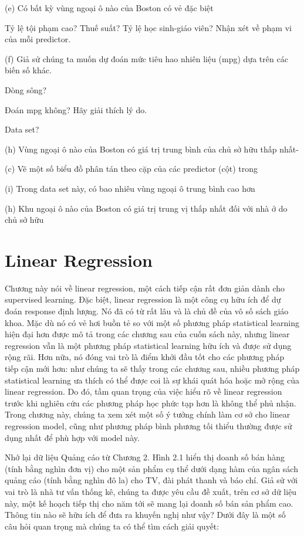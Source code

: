 (e) Có bất kỳ vùng ngoại ô nào của Boston có vẻ đặc biệt

Tỷ lệ tội phạm cao? Thuế suất? Tỷ lệ học sinh-giáo viên? Nhận xét về phạm vi của mỗi predictor.

(f) Giả sử chúng ta muốn dự đoán mức tiêu hao nhiên liệu (mpg) dựa trên các biến số khác.

Dòng sông?

Đoán mpg không? Hãy giải thích lý do.

Data set?

(h) Vùng ngoại ô nào của Boston có giá trị trung bình của chủ sở hữu thấp nhất-

(c) Vẽ một số biểu đồ phân tán theo cặp của các predictor (cột) trong

(i) Trong data set này, có bao nhiêu vùng ngoại ô trung bình cao hơn

(h) Khu ngoại ô nào của Boston có giá trị trung vị thấp nhất đối với nhà ở do chủ sở hữu

\section{Linear Regression}

Chương này nói về linear regression, một cách tiếp cận rất đơn giản dành cho supervised learning. Đặc biệt, linear regression là một công cụ hữu ích để dự đoán response định lượng. Nó đã có từ rất lâu và là chủ đề của vô số sách giáo khoa. Mặc dù nó có vẻ hơi buồn tẻ so với một số phương pháp statistical learning hiện đại hơn được mô tả trong các chương sau của cuốn sách này, nhưng linear regression vẫn là một phương pháp statistical learning hữu ích và được sử dụng rộng rãi. Hơn nữa, nó đóng vai trò là điểm khởi đầu tốt cho các phương pháp tiếp cận mới hơn: như chúng ta sẽ thấy trong các chương sau, nhiều phương pháp statistical learning ưa thích có thể được coi là sự khái quát hóa hoặc mở rộng của linear regression. Do đó, tầm quan trọng của việc hiểu rõ về linear regression trước khi nghiên cứu các phương pháp học phức tạp hơn là không thể phủ nhận. Trong chương này, chúng ta xem xét một số ý tưởng chính làm cơ sở cho linear regression model, cũng như phương pháp bình phương tối thiểu thường được sử dụng nhất để phù hợp với model này.

Nhớ lại dữ liệu Quảng cáo từ Chương 2. Hình 2.1 hiển thị doanh số bán hàng (tính bằng nghìn đơn vị) cho một sản phẩm cụ thể dưới dạng hàm của ngân sách quảng cáo (tính bằng nghìn đô la) cho TV, đài phát thanh và báo chí. Giả sử với vai trò là nhà tư vấn thống kê, chúng ta được yêu cầu đề xuất, trên cơ sở dữ liệu này, một kế hoạch tiếp thị cho năm tới sẽ mang lại doanh số bán sản phẩm cao. Thông tin nào sẽ hữu ích để đưa ra khuyến nghị như vậy? Dưới đây là một số câu hỏi quan trọng mà chúng ta có thể tìm cách giải quyết:

